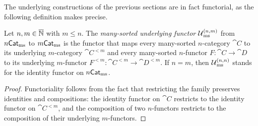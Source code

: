 The underlying constructions of the previous sections are in fact functorial, as the following
definition makes precise.

\begin{construction}
  \label{def:ManySortedUnderlyingFunctor}
  \leanok
  Let $n, m \in \overline{\mathbb{N}}$ with $m \leq n$. The \emph{many-sorted underlying functor}
  $\operatorname{\mathcal{U}}_{\mathrm{ms}}^{(n, m)}$ from $n\mathsf{Cat}_{\mathrm{ms}}$ to $m\mathsf{Cat}_{\mathrm{ms}}$ is the functor that maps every many-sorted
  $n$-category $\cat{C}$ to its underlying $m$-category $\cat{C}^{<m}$ and every many-sorted
  $n$-functor $F \colon \cat{C} \to \cat{D}$ to its underlying $m$-functor $F^{<m} \colon
  \cat{C}^{<m} \to \cat{D}^{<m}$. If $n = m$, then $\operatorname{\mathcal{U}}_{\mathrm{ms}}^{(n, n)}$ stands for the identity
  functor on $n\mathsf{Cat}_{\mathrm{ms}}$.
\end{construction}

\begin{proof}
  \leanok
  Functoriality follows from the fact that restricting the family preserves identities and
  compositions: the identity functor on $\cat{C}$ restricts to the identity functor on
  $\cat{C}^{<m}$, and the composition of two $n$-functors restricts to the composition of their
  underlying $m$-functors.
\end{proof}
